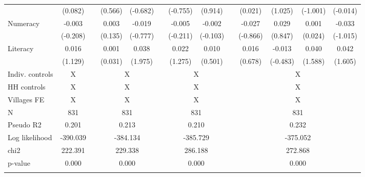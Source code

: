 \begin{table}[htbp]
{\begin{tabular}{lcccccccccccc}
          & (0.082) &       & (0.566) & (-0.682) &       & (-0.755) & (0.914) &       & (0.021) & (1.025) & (-1.001) & (-0.014) \\
    Numeracy & -0.003 &       & 0.003 & -0.019 &       & -0.005 & -0.002 &       & -0.027 & 0.029 & 0.001 & -0.033 \\
          & (-0.208) &       & (0.135) & (-0.777) &       & (-0.211) & (-0.103) &       & (-0.866) & (0.847) & (0.024) & (-1.015) \\
    Literacy & 0.016 &       & 0.001 & 0.038 &       & 0.022 & 0.010 &       & 0.016 & -0.013 & 0.040 & 0.042 \\
          & (1.129) &       & (0.031) & (1.975) &       & (1.275) & (0.501) &       & (0.678) & (-0.483) & (1.588) & (1.605) \\
    Indiv. controls & X     &       & \multicolumn{2}{c}{X} &       & \multicolumn{2}{c}{X} &       & \multicolumn{4}{c}{X} \\
    HH controls & X     &       & \multicolumn{2}{c}{X} &       & \multicolumn{2}{c}{X} &       & \multicolumn{4}{c}{X} \\
    Villages FE & X     &       & \multicolumn{2}{c}{X} &       & \multicolumn{2}{c}{X} &       & \multicolumn{4}{c}{X} \\
\cmidrule{1-2}\cmidrule{4-5}\cmidrule{7-8}\cmidrule{10-13}    N     & 831   &       & \multicolumn{2}{c}{831} &       & \multicolumn{2}{c}{831} &       & \multicolumn{4}{c}{831} \\
    Pseudo R2 & 0.201 &       & \multicolumn{2}{c}{0.213} &       & \multicolumn{2}{c}{0.210} &       & \multicolumn{4}{c}{0.232} \\
    Log likelihood & -390.039 &       & \multicolumn{2}{c}{-384.134} &       & \multicolumn{2}{c}{-385.729} &       & \multicolumn{4}{c}{-375.052} \\
    chi2  & 222.391 &       & \multicolumn{2}{c}{229.338} &       & \multicolumn{2}{c}{286.188} &       & \multicolumn{4}{c}{272.868} \\
    p-value & 0.000 &       & \multicolumn{2}{c}{0.000} &       & \multicolumn{2}{c}{0.000} &       & \multicolumn{4}{c}{0.000} \\
    \bottomrule
	\Tablenote{13}{t-stat in parentheses.} \\
    \end{tabular}%
	}
  \label{tab:ame_indebt}%
\end{table}%


